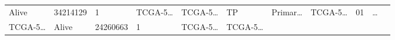 \documentclass[
]{article}
\begin{document}
\begin{longtable}[]{@{}lllllllllll@{}}
\begin{minipage}[t]{0.04\columnwidth}
Alive\strut
\end{minipage} & \begin{minipage}[t]{0.06\columnwidth}\raggedright
34214129\strut
\end{minipage} & \begin{minipage}[t]{0.07\columnwidth}\raggedright
1\strut
\end{minipage} & \begin{minipage}[t]{0.07\columnwidth}\raggedright
TCGA-5\ldots{}\strut
\end{minipage} & \begin{minipage}[t]{0.07\columnwidth}\raggedright
TCGA-5\ldots{}\strut
\end{minipage} & \begin{minipage}[t]{0.07\columnwidth}\raggedright
TP\strut
\end{minipage} & \begin{minipage}[t]{0.07\columnwidth}\raggedright
Primar\ldots{}\strut
\end{minipage} & \begin{minipage}[t]{0.09\columnwidth}\raggedright
TCGA-5\ldots{}\strut
\end{minipage} & \begin{minipage}[t]{0.10\columnwidth}\raggedright
01\strut
\end{minipage} & \begin{minipage}[t]{0.03\columnwidth}\raggedright
\ldots{}\strut
\end{minipage}\tabularnewline
\begin{minipage}[t]{0.07\columnwidth}\raggedright
TCGA-5\ldots{}\strut
\end{minipage} & \begin{minipage}[t]{0.04\columnwidth}\raggedright
Alive\strut
\end{minipage} & \begin{minipage}[t]{0.06\columnwidth}\raggedright
24260663\strut
\end{minipage} & \begin{minipage}[t]{0.07\columnwidth}\raggedright
1\strut
\end{minipage} & \begin{minipage}[t]{0.07\columnwidth}\raggedright
TCGA-5\ldots{}\strut
\end{minipage} & \begin{minipage}[t]{0.07\columnwidth}\raggedright
TCGA-5\ldots{}\strut
\end{minipage} & \begin{minipage}[t]{0.07\columnwidth}\raggedright

\end{minipage}
\end{longtable}
\end{document}
